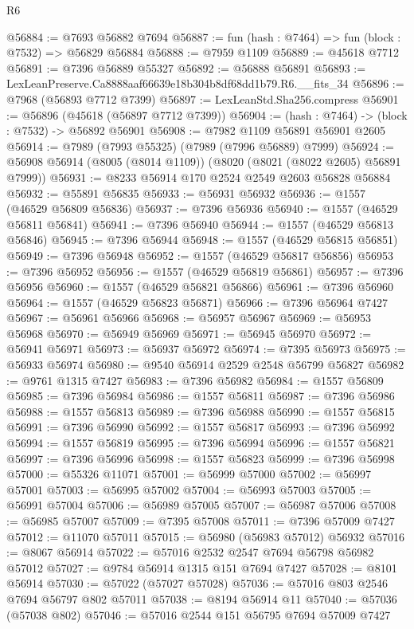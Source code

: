 \begin{lexlean}{R6}
\begin{coremodule}
@56884 := @7693 @56882 @7694
@56887 := fun (hash : @7464) => fun (block : @7532) => @56829 @56884
@56888 := @7959 @1109
@56889 := @45618 @7712
@56891 := @7396 @56889 @55327
@56892 := @56888 @56891
@56893 := LexLeanPreserve.Ca8888aaf66639e18b304b8df68dd1b79.R6.__fits_34
@56896 := @7968 (@56893 @7712 @7399)
@56897 := LexLeanStd.Sha256.compress
@56901 := @56896 (@45618 (@56897 @7712 @7399))
@56904 := (hash : @7464) -> (block : @7532) -> @56892 @56901
@56908 := @7982 @1109 @56891 @56901 @2605
@56914 := @7989 (@7993 @55325) (@7989 (@7996 @56889) @7999)
@56924 := @56908 @56914 (@8005 (@8014 @1109)) (@8020 (@8021 (@8022 @2605) @56891 @7999))
@56931 := @8233 @56914 @170 @2524 @2549 @2603 @56828 @56884
@56932 := @55891 @56835
@56933 := @56931 @56932
@56936 := @1557 (@46529 @56809 @56836)
@56937 := @7396 @56936
@56940 := @1557 (@46529 @56811 @56841)
@56941 := @7396 @56940
@56944 := @1557 (@46529 @56813 @56846)
@56945 := @7396 @56944
@56948 := @1557 (@46529 @56815 @56851)
@56949 := @7396 @56948
@56952 := @1557 (@46529 @56817 @56856)
@56953 := @7396 @56952
@56956 := @1557 (@46529 @56819 @56861)
@56957 := @7396 @56956
@56960 := @1557 (@46529 @56821 @56866)
@56961 := @7396 @56960
@56964 := @1557 (@46529 @56823 @56871)
@56966 := @7396 @56964 @7427
@56967 := @56961 @56966
@56968 := @56957 @56967
@56969 := @56953 @56968
@56970 := @56949 @56969
@56971 := @56945 @56970
@56972 := @56941 @56971
@56973 := @56937 @56972
@56974 := @7395 @56973
@56975 := @56933 @56974
@56980 := @9540 @56914 @2529 @2548 @56799 @56827
@56982 := @9761 @1315 @7427
@56983 := @7396 @56982
@56984 := @1557 @56809
@56985 := @7396 @56984
@56986 := @1557 @56811
@56987 := @7396 @56986
@56988 := @1557 @56813
@56989 := @7396 @56988
@56990 := @1557 @56815
@56991 := @7396 @56990
@56992 := @1557 @56817
@56993 := @7396 @56992
@56994 := @1557 @56819
@56995 := @7396 @56994
@56996 := @1557 @56821
@56997 := @7396 @56996
@56998 := @1557 @56823
@56999 := @7396 @56998
@57000 := @55326 @11071
@57001 := @56999 @57000
@57002 := @56997 @57001
@57003 := @56995 @57002
@57004 := @56993 @57003
@57005 := @56991 @57004
@57006 := @56989 @57005
@57007 := @56987 @57006
@57008 := @56985 @57007
@57009 := @7395 @57008
@57011 := @7396 @57009 @7427
@57012 := @11070 @57011
@57015 := @56980 (@56983 @57012) @56932
@57016 := @8067 @56914
@57022 := @57016 @2532 @2547 @7694 @56798 @56982 @57012
@57027 := @9784 @56914 @1315 @151 @7694 @7427
@57028 := @8101 @56914
@57030 := @57022 (@57027 @57028)
@57036 := @57016 @803 @2546 @7694 @56797 @802 @57011
@57038 := @8194 @56914 @11
@57040 := @57036 (@57038 @802)
@57046 := @57016 @2544 @151 @56795 @7694 @57009 @7427

\end{coremodule}
\end{lexlean}
